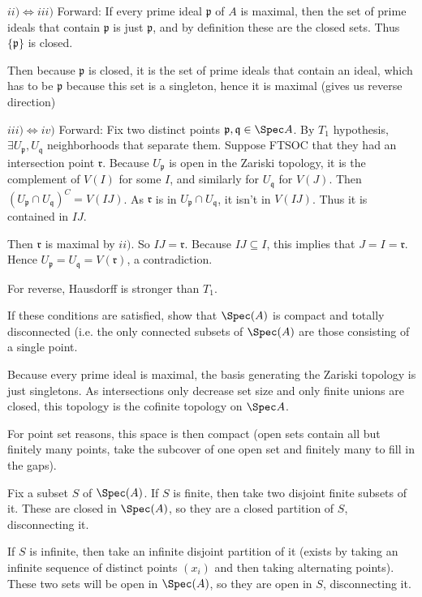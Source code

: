 \begin{questions}
\begin{solution}
	$ii)\iff iii) $ Forward: If every prime ideal $\mathfrak{p} $ of $A $ is maximal, then the set of prime ideals that contain $\mathfrak{p} $ is just $\mathfrak{p} $, and by definition these are the closed sets.
	Thus $\{\mathfrak{p}\}   $ is closed.

	Then because ${\mathfrak{p}} $ is closed, it is the set of prime ideals that contain an ideal, which has to be $\mathfrak{p}$ because this set is a singleton, hence it is maximal (gives us reverse direction)

	$iii) \iff iv) $ Forward: Fix two distinct points $\mathfrak{p},\mathfrak{q} \in \Spec A $.
	By $T_{1} $ hypothesis, $\exists U_ \mathfrak{p}, U_{\mathfrak{q}}$ neighborhoods that separate them.
	Suppose FTSOC that they had an intersection point $\mathfrak{r} $.
	Because $U_{\mathfrak{p}} $ is open in the Zariski topology, it is the complement of $V(I) $ for some $I $, and similarly for $U_{\mathfrak{q}} $ for $V(J) $.
	Then $ (U_{\mathfrak{p}} \cap U_{\mathfrak{q}})^C = V(IJ)$.
	As $\mathfrak{r} $ is in $U_{\mathfrak{p}} \cap U_{\mathfrak{q}}$, it isn't in $V(IJ) $.
	Thus it is contained in $IJ$.

	Then $\mathfrak{r} $ is maximal by $ii) $.
	So $IJ = \mathfrak{r} $.
	Because $IJ \subseteq I $, this implies that $J = I = \mathfrak{r}$.
	Hence $U_{\mathfrak{p}} = U_{\mathfrak{q}} = V(\mathfrak{r})$, a contradiction.

	For reverse, Hausdorff is stronger than $T_{1} $.
\end{solution}
If these conditions are satisfied, show that $\Spec(A) $ is compact and totally disconnected (i.e. the only connected subsets of $\Spec(A) $ are those consisting of a single point.
\begin{solution}
	Because every prime ideal is maximal, the basis generating the Zariski topology is just singletons.
	As intersections only decrease set size and only finite unions are closed, this topology is the cofinite topology on $\Spec A $.

	For point set reasons, this space is then compact (open sets contain all but finitely many points, take the subcover of one open set and finitely many to fill in the gaps).

	Fix a subset $S $ of $\Spec(A) $.
	If $S $ is finite, then take two disjoint finite subsets of it.
	These are closed in $\Spec(A) $, so they are a closed partition of $S $, disconnecting it.

	If $S $ is infinite, then take an infinite disjoint partition of it (exists by taking an infinite sequence of distinct points $(x_i) $ and then taking alternating points).
	These two sets will be open in $\Spec(A) $, so they are open in $S $, disconnecting it.
\end{solution}


\end{questions}
